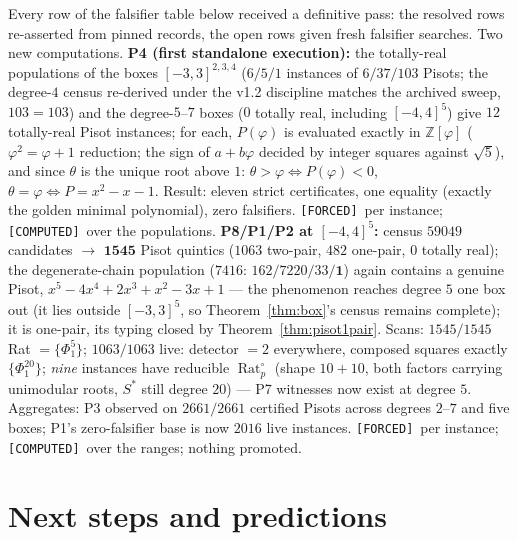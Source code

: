 \documentclass[11pt]{article}
\newcommand{\F}{\textnormal{\texttt{[FORCED]}}}
\newcommand{\C}{\textnormal{\texttt{[COMPUTED]}}}
\newcommand{\Z}{\mathbb{Z}}
\newcommand{\Rat}{\operatorname{Rat}}
\theoremstyle{definition}
\begin{document}
Every row of the falsifier table below received a definitive pass: the
resolved rows re-asserted from pinned records, the open rows given fresh
falsifier searches. Two new computations. \textbf{P4 (first standalone
execution):} the totally-real populations of the boxes $[-3,3]^{2,3,4}$
($6/5/1$ instances of $6/37/103$ Pisots; the degree-$4$ census re-derived
under the v1.2 discipline matches the archived sweep, $103=103$) and the
degree-$5$--$7$ boxes ($0$ totally real, including $[-4,4]^5$) give $12$
totally-real Pisot instances; for each, $P(\varphi)$ is evaluated exactly
in $\Z[\varphi]$ ($\varphi^2=\varphi+1$ reduction; the sign of $a+b\varphi$
decided by integer squares against $\sqrt5$), and since $\theta$ is the
unique root above $1$: $\theta>\varphi\iff P(\varphi)<0$,
$\theta=\varphi\iff P=x^2-x-1$. Result: eleven strict certificates, one
equality (exactly the golden minimal polynomial), zero falsifiers. \F\ per
instance; \C\ over the populations. \textbf{P8/P1/P2 at $[-4,4]^5$:}
census $59049$ candidates $\to$ $\mathbf{1545}$ Pisot quintics ($1063$
two-pair, $482$ one-pair, $0$ totally real); the degenerate-chain
population ($7416$: $162/7220/33/\mathbf{1}$) again contains a genuine
Pisot, $x^5-4x^4+2x^3+x^2-3x+1$ --- the phenomenon reaches degree $5$ one
box out (it lies outside $[-3,3]^5$, so Theorem~\ref{thm:box}'s census
remains complete); it is one-pair, its typing closed by
Theorem~\ref{thm:pisot1pair}. Scans: $1545/1545$ Rat $=\{\Phi_1^5\}$;
$1063/1063$ live: detector $=2$ everywhere, composed squares exactly
$\{\Phi_1^{20}\}$; \emph{nine} instances have reducible $\Rat_p^{\circ}$
(shape $10{+}10$, both factors carrying unimodular roots, $S^{*}$ still
degree $20$) --- P7 witnesses now exist at degree $5$. Aggregates: P3
observed on $2661/2661$ certified Pisots across degrees $2$--$7$ and five
boxes; P1's zero-falsifier base is now $2016$ live instances. \F\ per
instance; \C\ over the ranges; nothing promoted.

\section{Next steps and predictions}\label{sec:next}
\end{document}
